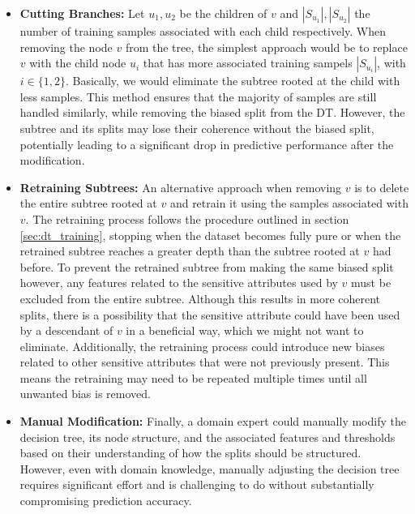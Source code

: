\begin{itemize}
    \item \textbf{Cutting Branches:} 
    Let $u_1, u_2$ be the children of $v$ and $|S_{u_1}|, |S_{u_2}|$
    the number of training samples associated with each child respectively.
    When removing the node $v$ from the tree,
    the simplest approach would be to replace $v$ with the child node $u_i$
    that has more associated training sampels $|S_{u_i}|$, with $i \in \{1,2\}$.
    Basically, we would eliminate the subtree rooted at the child with less samples.
    This method ensures that the majority of samples are still handled similarly,
    while removing the biased split from the DT.
    However, the subtree and its splits may lose their coherence without the biased split,
    potentially leading to a significant drop in predictive performance after the modification.

    \item \textbf{Retraining Subtrees:}
    An alternative approach when removing $v$ is to delete the entire subtree rooted at $v$
    and retrain it using the samples associated with $v$.  
    The retraining process follows the procedure outlined in section \ref{sec:dt_training},
    stopping when the dataset becomes fully pure or when the retrained subtree reaches a greater depth than the
    subtree rooted at $v$ had before.  
    To prevent the retrained subtree from making the same biased split however,
    any features related to the sensitive attributes used by $v$ must be excluded from the entire subtree.  
    Although this results in more coherent splits,
    there is a possibility that the sensitive attribute could have been used by a descendant of $v$ in a beneficial way,
    which we might not want to eliminate.
    Additionally, the retraining process could introduce new biases related to other sensitive attributes that were not previously present.  
    This means the retraining may need to be repeated multiple times until all unwanted bias is removed.  

    \item \textbf{Manual Modification:}  
    Finally, a domain expert could manually modify the decision tree, its node structure,
    and the associated features and thresholds based on their understanding of how the splits should be structured.
    However, even with domain knowledge,
    manually adjusting the decision tree requires significant effort
    and is challenging to do without substantially compromising prediction accuracy.
\end{itemize}

